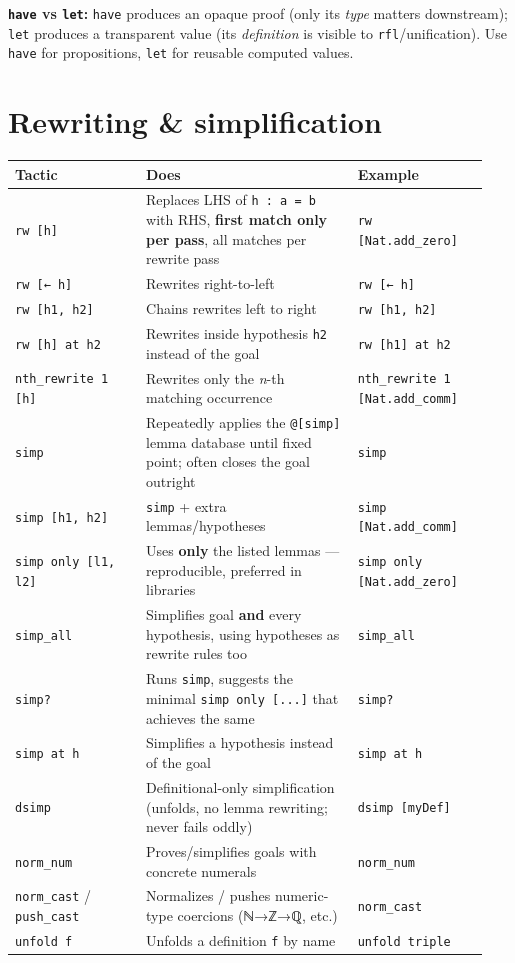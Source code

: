 \textbf{\texttt{have} vs \texttt{let}:} \texttt{have} produces an opaque proof (only its \emph{type} matters downstream); \texttt{let} produces a transparent value (its \emph{definition} is visible to \texttt{rfl}/unification). Use \texttt{have} for propositions, \texttt{let} for reusable computed values.

\section{Rewriting \& simplification}

\begin{center}
\begin{tabular}{@{}p{0.26\linewidth}p{0.42\linewidth}p{0.26\linewidth}@{}}
\hline
\textbf{Tactic} & \textbf{Does} & \textbf{Example} \\
\hline
\texttt{rw [h]} & Replaces LHS of \texttt{h : a = b} with RHS, \textbf{first match only per pass}, all matches per rewrite pass & \texttt{rw [Nat.add\_zero]} \\
\texttt{rw [← h]} & Rewrites right-to-left & \texttt{rw [← h]} \\
\texttt{rw [h1, h2]} & Chains rewrites left to right & \texttt{rw [h1, h2]} \\
\texttt{rw [h] at h2} & Rewrites inside hypothesis \texttt{h2} instead of the goal & \texttt{rw [h1] at h2} \\
\texttt{nth\_rewrite 1 [h]} & Rewrites only the \emph{n}-th matching occurrence & \texttt{nth\_rewrite 1 [Nat.add\_comm]} \\
\texttt{simp} & Repeatedly applies the \texttt{@[simp]} lemma database until fixed point; often closes the goal outright & \texttt{simp} \\
\texttt{simp [h1, h2]} & \texttt{simp} + extra lemmas/hypotheses & \texttt{simp [Nat.add\_comm]} \\
\texttt{simp only [l1, l2]} & Uses \textbf{only} the listed lemmas --- reproducible, preferred in libraries & \texttt{simp only [Nat.add\_zero]} \\
\texttt{simp\_all} & Simplifies goal \textbf{and} every hypothesis, using hypotheses as rewrite rules too & \texttt{simp\_all} \\
\texttt{simp?} & Runs \texttt{simp}, suggests the minimal \texttt{simp only [...]} that achieves the same & \texttt{simp?} \\
\texttt{simp at h} & Simplifies a hypothesis instead of the goal & \texttt{simp at h} \\
\texttt{dsimp} & Definitional-only simplification (unfolds, no lemma rewriting; never fails oddly) & \texttt{dsimp [myDef]} \\
\texttt{norm\_num} & Proves/simplifies goals with concrete numerals & \texttt{norm\_num} \\
\texttt{norm\_cast} / \texttt{push\_cast} & Normalizes / pushes numeric-type coercions (ℕ→ℤ→ℚ, etc.) & \texttt{norm\_cast} \\
\texttt{unfold f} & Unfolds a definition \texttt{f} by name & \texttt{unfold triple} \\
\hline
\end{tabular}
\end{center}

